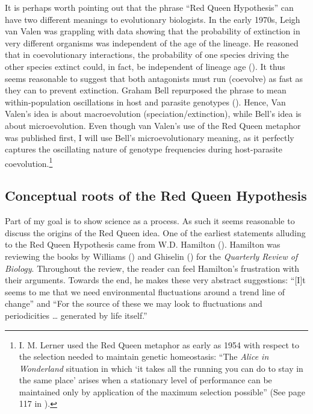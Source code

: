 \documentclass[
  letterpaper,
]{book}
\begin{document}
It is perhaps worth pointing out that the phrase ``Red Queen
Hypothesis'' can have two different meanings to evolutionary biologists.
In the early 1970s, Leigh van Valen was grappling with data showing that
the probability of extinction in very different organisms was
independent of the age of the lineage. He reasoned that in
coevolutionary interactions, the probability of one species driving the
other species extinct could, in fact, be independent of lineage age
(). It thus seems reasonable to suggest
that both antagonists must run (coevolve) as fast as they can to prevent
extinction. Graham Bell repurposed the phrase to mean within-population
oscillations in host and parasite genotypes
(). Hence, Van Valen's idea is about
macroevolution (speciation/extinction), while Bell's idea is about
microevolution. Even though van Valen's use of the Red Queen metaphor
was published first, I will use Bell's microevolutionary meaning, as it
perfectly captures the oscillating nature of genotype frequencies during
host-parasite coevolution.\footnote{I. M. Lerner used the Red Queen
  metaphor as early as 1954 with respect to the selection needed to
  maintain genetic homeostasis: ``The \emph{Alice in Wonderland}
  situation in which `it takes all the running you can do to stay in the
  same place' arises when a stationary level of performance can be
  maintained only by application of the maximum selection possible''
  (See page 117 in ).}

\subsection{Conceptual roots of the Red Queen
Hypothesis}\label{conceptual-roots-of-the-red-queen-hypothesis}

Part of my goal is to show science as a process. As such it seems
reasonable to discuss the origins of the Red Queen idea. One of the
earliest statements alluding to the Red Queen Hypothesis came from W.D.
Hamilton (). Hamilton was reviewing
the books by Williams () and Ghiselin
() for the \emph{Quarterly Review of
Biology}. Throughout the review, the reader can feel Hamilton's
frustration with their arguments. Towards the end, he makes these very
abstract suggestions: ``{[}I{]}t seems to me that we need environmental
fluctuations around a trend line of change'' and ``For the source of
these we may look to fluctuations and periodicities \ldots{} generated
by life itself.''
\end{document}
